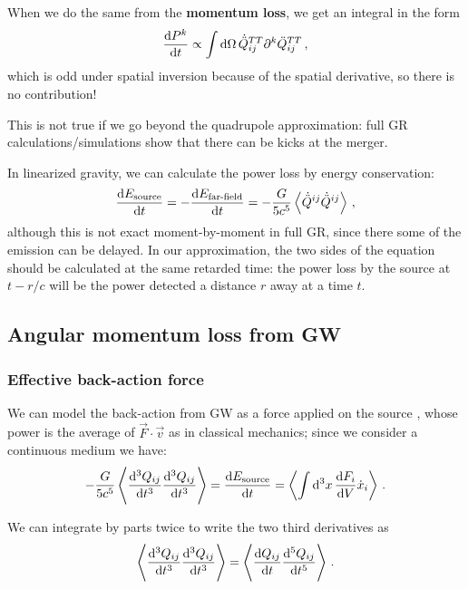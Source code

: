 \documentclass[main.tex]{subfiles}
\begin{document}
When we do the same from the \textbf{momentum loss}, we get an integral in the form 
%
\begin{align}
\dv{P^{k}}{t} \propto \int \dd{\Omega } \dot{\ddot{Q}}^{TT}_{ij} \partial^{k} \ddot{Q}^{TT}_{ij}
\,,
\end{align}
%
which is odd under spatial inversion because of the spatial derivative, so there is no contribution!

This is not true if we go beyond the quadrupole approximation: full GR calculations/simulations show that there can be kicks at the merger. 

In linearized gravity, we can calculate the power loss by energy conservation: 
%
\begin{align}
\dv{E _{\text{source}}}{t} = - \dv{E _{\text{far-field}}}{t} = - \frac{G}{5c^{5}} \expval{\dot{\ddot{Q}}^{ij} \dot{\ddot{Q}}^{ij}}
\,,
\end{align}
%
although this is not exact moment-by-moment in full GR, since there some of the emission can be delayed. 
In our approximation, the two sides of the equation should be calculated at the same retarded time: the power loss by the source at \(t - r/c\) will be the power detected a distance \(r\) away at a time \(t\). 

\subsection{Angular momentum loss from GW}

\subsubsection{Effective back-action force}


We can model the back-action from GW as a force applied on the source \cite[sec.\ 3.3.4]{maggioreGravitationalWavesVolume2007}, whose power is the average of \(\vec{F} \cdot \vec{v}\) as in classical mechanics; since we consider a continuous medium we have:
%
\begin{align}
- \frac{G}{5 c^{5}} \expval{\dv[3]{Q_{ij}}{t} \dv[3]{Q_{ij}}{t}}
= \dv{E _{\text{source}}}{t} = 
\expval{\int  \dd[3]{x} \dv{F_i}{V} \dot{x}_{i}} 
\,.
\end{align}

We can integrate by parts twice to write the two third derivatives as 
%
\begin{align}
\expval{\dv[3]{Q_{ij}}{t} \dv[3]{Q_{ij}}{t}}
= \expval{\dv{Q_{ij}}{t} \dv[5]{Q_{ij}}{t}}
\,.
\end{align}
\end{document}

